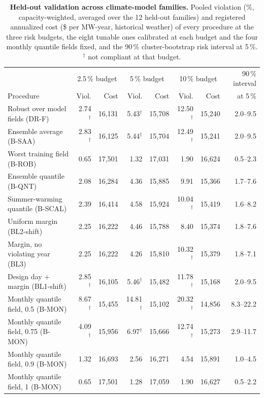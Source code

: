 \begin{table}[p]
\centering
\footnotesize
\setlength{\tabcolsep}{3.5pt}
\caption{\textbf{Held-out validation across climate-model families.} Pooled violation (\%, capacity-weighted, averaged over the 12 held-out families) and registered annualized cost (\$ per MW-year, historical weather) of every procedure at the three risk budgets, the eight tunable ones calibrated at each budget and the four monthly quantile fields fixed, and the 90\,\% cluster-bootstrap risk interval at 5\,\%. $^{\dagger}$ not compliant at that budget.}\label{tab:s12}
\begin{tabular}{@{}lrrrrrrr@{}}
\toprule
& \multicolumn{2}{c}{2.5\,\% budget} & \multicolumn{2}{c}{5\,\% budget} & \multicolumn{2}{c}{10\,\% budget} & 90\,\% interval\\
Procedure & Viol. & Cost & Viol. & Cost & Viol. & Cost & at 5\,\% \\
\midrule
Robust over model fields (DR-F) & 2.74$^{\dagger}$ & 16,131 & 5.43$^{\dagger}$ & 15,708 & 12.50$^{\dagger}$ & 15,240 & 2.0--9.5 \\
Ensemble average (B-SAA) & 2.83$^{\dagger}$ & 16,125 & 5.44$^{\dagger}$ & 15,704 & 12.49$^{\dagger}$ & 15,241 & 2.0--9.5 \\
Worst training field (B-ROB) & 0.65 & 17,501 & 1.32 & 17,031 & 1.90 & 16,624 & 0.5--2.3 \\
Ensemble quantile (B-QNT) & 2.08 & 16,284 & 4.36 & 15,885 & 9.91 & 15,366 & 1.7--7.6 \\
Summer-warming quantile (B-SCAL) & 2.39 & 16,414 & 4.58 & 15,924 & 10.04$^{\dagger}$ & 15,419 & 1.6--8.2 \\
Uniform margin (BL2-shift) & 2.25 & 16,222 & 4.46 & 15,788 & 8.40 & 15,374 & 1.8--7.6 \\
Margin, no violating year (BL3) & 2.25 & 16,222 & 4.26 & 15,810 & 10.32$^{\dagger}$ & 15,379 & 1.8--7.1 \\
Design day + margin (BL1-shift) & 2.85$^{\dagger}$ & 16,105 & 5.46$^{\dagger}$ & 15,482 & 11.78$^{\dagger}$ & 15,168 & 2.0--9.5 \\
Monthly quantile field, 0.5 (B-MON) & 8.67$^{\dagger}$ & 15,455 & 14.81$^{\dagger}$ & 15,102 & 20.32$^{\dagger}$ & 14,856 & 8.3--22.2 \\
Monthly quantile field, 0.75 (B-MON) & 4.09$^{\dagger}$ & 15,956 & 6.97$^{\dagger}$ & 15,666 & 12.74$^{\dagger}$ & 15,273 & 2.9--11.7 \\
Monthly quantile field, 0.9 (B-MON) & 1.32 & 16,693 & 2.56 & 16,271 & 4.54 & 15,891 & 1.0--4.5 \\
Monthly quantile field, 1 (B-MON) & 0.65 & 17,501 & 1.28 & 17,059 & 1.90 & 16,627 & 0.5--2.2 \\
\bottomrule
\end{tabular}
\end{table}
